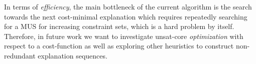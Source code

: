 In terms of \emph{efficiency}, the main bottleneck of the current algorithm is the search towards the next cost-minimal explanation
which requires repeatedly searching for a MUS for increasing constraint sets, which is a hard problem by itself.
Therefore, in future work we want to investigate unsat-core \emph{optimization} with respect to a cost-function as well as exploring other heuristics to construct non-redundant explanation sequences.%